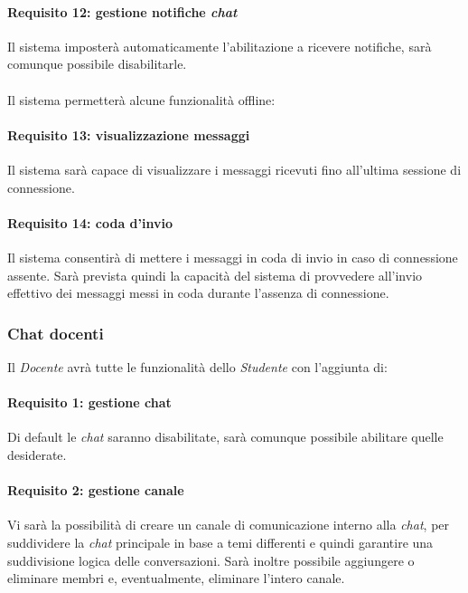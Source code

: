 \paragraph{Requisito 12: gestione notifiche \emph{chat}\\}
Il sistema imposterà automaticamente l’abilitazione a ricevere notifiche, sarà comunque possibile disabilitarle.\\
\\
Il sistema permetterà alcune funzionalità offline: %

\paragraph{Requisito 13: visualizzazione messaggi\\}
Il sistema sarà capace di visualizzare i messaggi ricevuti fino all’ultima sessione di connessione.

\paragraph{Requisito 14: coda d'invio\\}
Il sistema consentirà di mettere i messaggi in coda di invio in caso di connessione assente. Sarà prevista quindi la capacità del sistema di provvedere all’invio effettivo dei messaggi messi in coda durante l’assenza di connessione.

\subsubsection{Chat docenti}
Il \emph{Docente} avrà tutte le funzionalità dello \emph{Studente} con l’aggiunta di:

\paragraph{Requisito 1: gestione chat\\}
Di default le \emph{chat} saranno disabilitate, sarà comunque possibile abilitare quelle desiderate.

\paragraph{Requisito 2: gestione canale\\}
Vi sarà la possibilità di creare un canale di comunicazione interno alla \emph{chat}, per suddividere la \emph{chat} principale in base a temi differenti e quindi garantire una suddivisione logica delle conversazioni. Sarà inoltre possibile aggiungere o eliminare membri e, eventualmente, eliminare l’intero canale.

